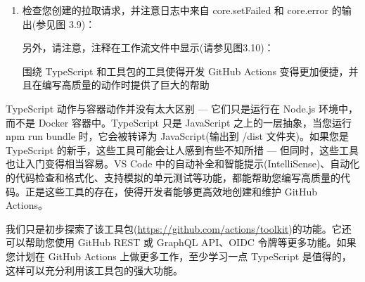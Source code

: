 \begin{enumerate}
\item 
检查您创建的拉取请求，并注意日志中来自 core.setFailed 和 core.error 的输出(参见图 3.9)：


另外，请注意，注释在工作流文件中显示(请参见图3.10)：


围绕 TypeScript 和工具包的工具使得开发 GitHub Actions 变得更加便捷，并且在编写高质量的动作时提供了巨大的帮助
\end{enumerate}


TypeScript 动作与容器动作并没有太大区别 --- 它们只是运行在 Node.js 环境中，而不是 Docker 容器中。TypeScript 只是 JavaScript 之上的一层抽象，当您运行 npm run bundle 时，它会被转译为 JavaScript(输出到 /dist 文件夹)。如果您是 TypeScript 的新手，这些工具可能会让人感到有些不知所措 --- 但同时，这些工具也让入门变得相当容易。VS Code 中的自动补全和智能提示(IntelliSense)、自动化的代码检查和格式化、支持模拟的单元测试等功能，都能帮助您编写高质量的代码。正是这些工具的存在，使得开发者能够更高效地创建和维护 GitHub Actions。


我们只是初步探索了该工具包(\url{https://github.com/actions/toolkit})的功能。它还可以帮助您使用 GitHub REST 或 GraphQL API、OIDC 令牌等更多功能。如果您计划在 GitHub Actions 上做更多工作，至少学习一点 TypeScript 是值得的，这样可以充分利用该工具包的强大功能。
